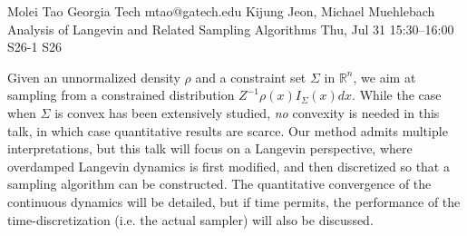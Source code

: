 \begin{talk}
  {Molei Tao}%
  {Georgia Tech}%
  {mtao@gatech.edu}%
  {Kijung Jeon, Michael Muehlebach}%
  {Analysis of Langevin and Related Sampling Algorithms}%
  {}%
  {Thu, Jul 31 15:30–16:00}%
  {S26-1}%
  {S26}%
				

Given an unnormalized density $\rho$ and a constraint set $\Sigma$ in $\mathbb{R}^n$, we aim at sampling from a constrained distribution $Z^{-1} \rho(x) I_{\Sigma}(x) dx$. While the case when $\Sigma$ is convex has been extensively studied, \emph{no} convexity is needed in this talk, in which case quantitative results are scarce. %
Our method admits multiple interpretations, but this talk will focus on a Langevin perspective, where overdamped Langevin dynamics is first modified, and then discretized so that a sampling algorithm can be constructed. The quantitative convergence of the continuous dynamics will be detailed, but if time permits, the performance of the time-discretization (i.e. the actual sampler) will also be discussed.





\end{talk}
